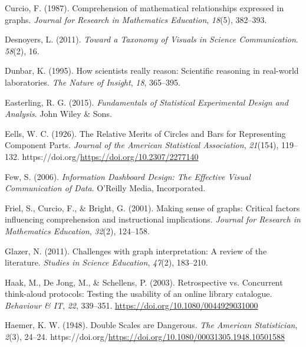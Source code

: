 \documentclass[
  10pt,
]{article}
\newlength{\cslhangindent}
\newenvironment{CSLReferences}[2] %
 {\begin{list}{}{%
  \setlength{\itemindent}{0pt}
  \setlength{\leftmargin}{0pt}
  \setlength{\parsep}{0pt}
  \ifodd #1
   \setlength{\leftmargin}{\cslhangindent}
   \setlength{\itemindent}{-1\cslhangindent}
  \fi
  \setlength{\itemsep}{#2\baselineskip}}}
 {\end{list}}
\begin{document}
\begin{CSLReferences}{1}{0}
Curcio, F. (1987). Comprehension of mathematical relationships expressed
in graphs. \emph{Journal for Research in Mathematics Education},
\emph{18}(5), 382--393.

Desnoyers, L. (2011). \emph{Toward a {Taxonomy} of {Visuals} in
{Science} {Communication}}. \emph{58}(2), 16.

Dunbar, K. (1995). How scientists really reason: {Scientific} reasoning
in real-world laboratories. \emph{The Nature of Insight}, \emph{18},
365--395.

Easterling, R. G. (2015). \emph{Fundamentals of {Statistical
Experimental Design} and {Analysis}}. John Wiley \& Sons.

Eells, W. C. (1926). The {Relative} {Merits} of {Circles} and {Bars} for
{Representing} {Component} {Parts}. \emph{Journal of the American
Statistical Association}, \emph{21}(154), 119--132.
https://doi.org/\url{https://doi.org/10.2307/2277140}

Few, S. (2006). \emph{Information {Dashboard} {Design}: {The}
{Effective} {Visual} {Communication} of {Data}}. O'Reilly Media,
Incorporated.

Friel, S., Curcio, F., \& Bright, G. (2001). Making sense of graphs:
Critical factors influencing comprehension and instructional
implications. \emph{Journal for Research in Mathematics Education},
\emph{32}(2), 124--158.

Glazer, N. (2011). Challenges with graph interpretation: A review of the
literature. \emph{Studies in Science Education}, \emph{47}(2), 183--210.

Haak, M., De Jong, M., \& Schellens, P. (2003). Retrospective vs.
Concurrent think-aloud protocols: Testing the usability of an online
library catalogue. \emph{Behaviour \& {IT}}, \emph{22}, 339--351.
\url{https://doi.org/10.1080/0044929031000}

Haemer, K. W. (1948). Double {Scales} are {Dangerous}. \emph{The
American Statistician}, \emph{2}(3), 24--24.
https://doi.org/\url{https://doi.org/10.1080/00031305.1948.10501588}


\end{CSLReferences}
\end{document}
